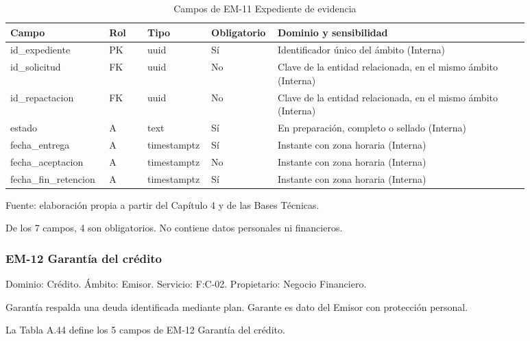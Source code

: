 \documentclass[11pt]{article}
\begin{document}
\begin{table}[htbp]
\caption{Campos de EM-11 Expediente de evidencia}\label{tab:d_em11}
\centering
\begin{tabular}{@{}p{0.167\linewidth}p{0.070\linewidth}p{0.079\linewidth}p{0.097\linewidth}p{0.465\linewidth}@{}}
\toprule Campo & Rol & Tipo & Obligatorio & Dominio y sensibilidad \\
\midrule
id\_expediente & PK & uuid & Sí & Identificador único del ámbito (Interna) \\
id\_solicitud & FK & uuid & No & Clave de la entidad relacionada, en el mismo ámbito (Interna) \\
id\_repactacion & FK & uuid & No & Clave de la entidad relacionada, en el mismo ámbito (Interna) \\
estado & A & text & Sí & En preparación, completo o sellado (Interna) \\
fecha\_entrega & A & timestamptz & Sí & Instante con zona horaria (Interna) \\
fecha\_aceptacion & A & timestamptz & No & Instante con zona horaria (Interna) \\
fecha\_fin\_retencion & A & timestamptz & Sí & Instante con zona horaria (Interna) \\
\bottomrule
\end{tabular}
\par\smallskip
{\raggedright Fuente: elaboración propia a partir del Capítulo 4 y de las Bases Técnicas.\par}
\end{table}


De los 7 campos, 4 son obligatorios. No contiene datos personales ni financieros.

\subsubsection{EM-12 Garantía del crédito}

Dominio: Crédito. Ámbito: Emisor. Servicio: F:C-02. Propietario: Negocio Financiero.

Garantía respalda una deuda identificada mediante plan. Garante es dato del Emisor con protección personal.

La Tabla A.44 define los 5 campos de EM-12 Garantía del crédito.

\clearpage
\end{document}

